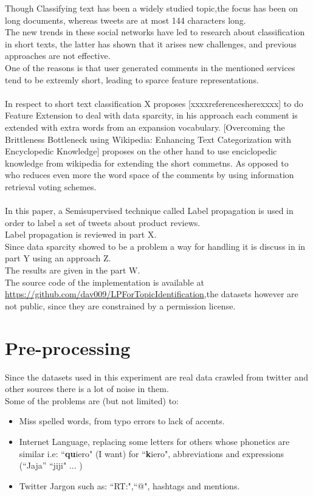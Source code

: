 \documentclass[4pt,a4paper,twocolumn]{article}
\begin{document}
Though Classifying text has been a widely studied topic,the focus has been on long documents,
whereas tweets are at most 144 characters long.\\
The new trends in these social networks have led to research about classification in short texts, the latter has  shown that it arises new challenges, and previous approaches are not  effective.\\
One of the reasons is that  user generated comments in the mentioned services tend to be extremly short, leading to sparce feature representations.\\
\\
In respect to short text classification X proposes [xxxxreferencesherexxxx] to do Feature Extension to deal with data sparcity, in his approach each comment is extended with extra words from an expansion vocabulary.
[Overcoming the Brittleness Bottleneck using Wikipedia:
Enhancing Text Categorization with Encyclopedic Knowledge] proposes on the other hand to use enciclopedic knowledge from wikipedia for extending the short commetns.
As opposed to ~\cite{Sun:2012:STC:2348283.2348511} who reduces even more the word space of the comments by using information retrieval voting schemes.\\
\\
In this paper, a Semisupervised technique called Label propagation is used
in order to label a set of tweets about product reviews.\\
Label propagation is reviewed in part X.\\
Since data sparcity showed to be a problem a way for handling it
is discuss in in part Y using an approach Z.\\
The results are given in the part W.\\
The source code of the implementation is available at \url{https://github.com/dav009/LPForTopicIdentification},the datasets however are not public, since they are constrained by a permission license.

\part*{Pre-processing}

Since the datasets used in this experiment are real data crawled from twitter and other sources there is a lot of noise in them.\\
Some of the problems are (but not limited) to:\\
\begin{itemize}
	\item Miss spelled words, from typo errors to lack of accents.
	\item Internet Language, replacing some letters for others whose phonetics are similar i.e: ``\textbf{qu}iero" (I want) for ``\textbf{k}iero", abbreviations and expressions (``Jaja'' ``jiji" ... )
	\item Twitter Jargon such as: ``RT:",``@", hashtags and mentions. 
\end{itemize} 
\end{document}
